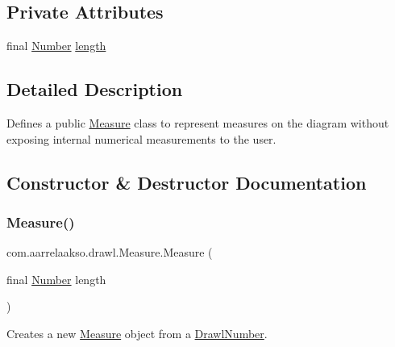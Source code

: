 \subsection*{Private Attributes}
\begin{DoxyCompactItemize}
\item 
final \hyperlink{interfacecom_1_1aarrelaakso_1_1drawl_1_1_number}{Number} \hyperlink{classcom_1_1aarrelaakso_1_1drawl_1_1_measure_aef040b9b0dd7d4a925448d0854c2444a}{length}
\end{DoxyCompactItemize}


\subsection{Detailed Description}
Defines a public \hyperlink{classcom_1_1aarrelaakso_1_1drawl_1_1_measure}{Measure} class to represent measures on the diagram without exposing internal numerical measurements to the user. 

\subsection{Constructor \& Destructor Documentation}
\mbox{\label{classcom_1_1aarrelaakso_1_1drawl_1_1_measure_a8a609ce1111f169f66c3c787d640363d}} 
\subsubsection{\texorpdfstring{Measure()}{Measure()}\hspace{0.1cm}{\footnotesize\ttfamily [1/2]}}
{\footnotesize\ttfamily com.\+aarrelaakso.\+drawl.\+Measure.\+Measure (\begin{DoxyParamCaption}\item[{final \hyperlink{interfacecom_1_1aarrelaakso_1_1drawl_1_1_number}{Number}}]{length }\end{DoxyParamCaption})\hspace{0.3cm}{\ttfamily [protected]}}



Creates a new \hyperlink{classcom_1_1aarrelaakso_1_1drawl_1_1_measure}{Measure} object from a \hyperlink{classcom_1_1aarrelaakso_1_1drawl_1_1_drawl_number}{Drawl\+Number}. 

